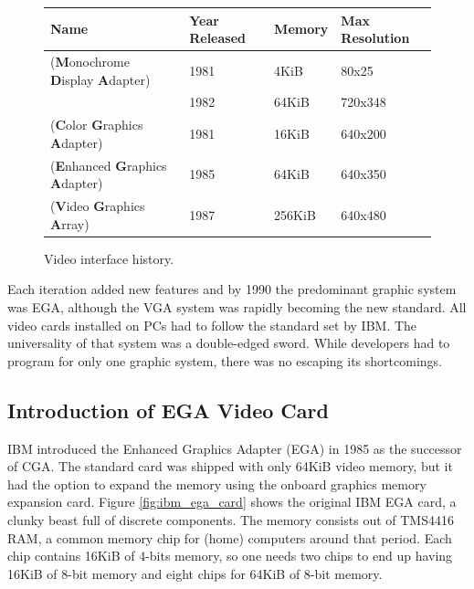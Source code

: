 \documentclass[book.tex]{subfiles}
\begin{document}
\bigskip
 \begin{figure}[H]
\centering  
\begin{tabularx}{\textwidth}{ l X l Y }
  \toprule
  \textbf{Name} &  \textbf{Year Released} & \textbf{Memory} & \textbf{Max Resolution}\\
  \toprule {}
   (\textbf{M}onochrome
   \textbf{D}isplay
   \textbf{A}dapter) & 1981 & 4KiB & 80x25\footnotemark 
   \\  & 1982 & 64KiB & 720x348
   \\ 
   (\textbf{C}olor
   \textbf{G}raphics
   \textbf{A}dapter) & 1981 & 16KiB & 640x200
    \\ 
   (\textbf{E}nhanced
   \textbf{G}raphics
   \textbf{A}dapter) & 1985 & 64KiB & 640x350
   \\ 
   (\textbf{V}ideo
   \textbf{G}raphics
   \textbf{A}rray)  & 1987 & 256KiB & 640x480
    \\
  \toprule
\end{tabularx}
\caption{Video interface history.}\label{fig:vga_history}
   
\end{figure}
\addtocounter{footnote}{-1}


Each iteration added new features and by 1990 the predominant graphic system was EGA, although the VGA system was rapidly becoming the new standard. All video cards installed on PCs had to follow the standard set by IBM. The universality of that system was a double-edged sword. While developers had to program for only one graphic system, there was no escaping its shortcomings.\\


\subsection{Introduction of EGA Video Card}

IBM introduced the Enhanced Graphics Adapter (EGA) in 1985 as the successor of CGA. The standard card was shipped with only 64KiB video memory, but it had the option to expand the memory using the onboard graphics memory expansion card.
Figure \ref{fig:ibm_ega_card} shows the original IBM EGA card, a clunky beast full of discrete components. The memory consists out of TMS4416 RAM, a common memory chip for (home) computers around that period. Each chip contains 16KiB of 4-bits memory, so one needs two chips to end up having 16KiB of 8-bit memory and eight chips for 64KiB of 8-bit memory. \\
\end{document}

